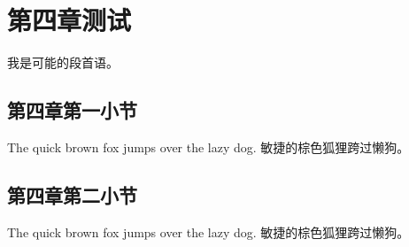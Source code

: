 \chapter{第四章测试}
\label{chap:quaternary}

我是可能的段首语。

\section{第四章第一小节}
\label{sec:quaternary:1}

The quick brown fox jumps over the lazy dog. 敏捷的棕色狐狸跨过懒狗。

\section{第四章第二小节}
\label{sec:quaternary:2}

The quick brown fox jumps over the lazy dog. 敏捷的棕色狐狸跨过懒狗。
